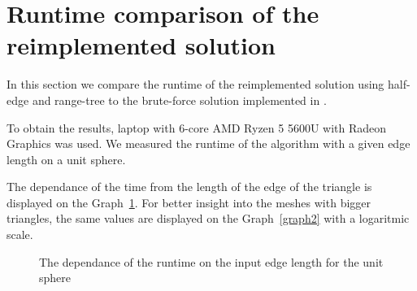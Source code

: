 \section{Runtime comparison of the reimplemented solution}
\label{sub4.3}
In this section we compare the runtime of the reimplemented solution using half-edge 
and range-tree to the brute-force solution implemented in \cite{korecova2021triangulation}.

To obtain the results, laptop with 6-core AMD Ryzen 5 5600U with Radeon Graphics was used.
We measured the runtime of the algorithm with a given edge length on a unit sphere.

The dependance of the time from the length of the edge of the triangle is
displayed on the Graph~\ref{graph1}.
For better insight into the meshes with bigger triangles, the same values are 
displayed on the Graph~\ref{graph2} with a logaritmic scale.

\renewcommand{\figurename}{Graph}
\begin{figure}
    \centering
{}
\caption[The dependance of the runtime on the input edge length for the unit sphere]
{The dependance of the runtime on the input edge length for the unit sphere}
\label{graph1}
\end{figure}

